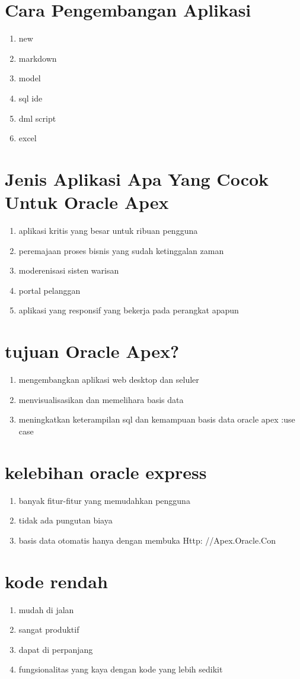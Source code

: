 ﻿\documentclass{article}
\begin{document}
\section{Cara Pengembangan Aplikasi}
\begin{enumerate}
\item new
\item markdown
\item model
\item sql ide
\item dml script
\item excel
\end{enumerate}

\section{Jenis Aplikasi Apa Yang Cocok Untuk Oracle Apex}
\begin{enumerate}
\item aplikasi kritis yang besar untuk ribuan pengguna
\item peremajaan proses bisnis yang sudah ketinggalan zaman
\item moderenisasi sisten warisan
\item portal pelanggan
\item aplikasi yang responsif yang bekerja pada perangkat apapun
\end{enumerate}

\section{tujuan Oracle Apex?}
\begin{enumerate}
\item mengembangkan aplikasi web desktop dan seluler
\item menvisualisasikan dan memelihara basis data
\item meningkatkan keterampilan sql dan kemampuan basis data oracle apex :use case
\end{enumerate}



\section{kelebihan oracle express}
\begin{enumerate}
    \item banyak fitur-fitur yang memudahkan pengguna
    \item tidak ada pungutan biaya
    \item basis data otomatis hanya dengan membuka Http: //Apex.Oracle.Con
\end{enumerate}

\section{kode rendah}
\begin{enumerate}
    \item mudah di jalan
    \item sangat produktif
    \item dapat di perpanjang
    \item fungsionalitas yang kaya dengan kode yang lebih sedikit
\end{enumerate}
\end{document}
